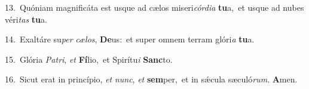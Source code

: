 {\numbfont\textcolor{\numbcolor}{13.}}~Quóniam magnificáta est usque ad cælos miseri\-\textit{cór}\-\textit{di}\textit{a} \textbf{tu}\-a,~\star et usque ad nubes véri\textit{tas} \textbf{tu}\-a.\par
{\numbfont\textcolor{\numbcolor}{14.}}~Exaltáre su\textit{per} \textit{cæ}\-\textit{los}, \textbf{De}\-us:~\star et super omnem terram glóri\textit{a} \textbf{tu}\-a.\par
{\numbfont\textcolor{\numbcolor}{15.}}~Glória \textit{Pa}\-\textit{tri}, \textit{et} \textbf{Fí}\-lio,~\star et Spirítu\textit{i} \textbf{Sanc}\-to.\par
{\numbfont\textcolor{\numbcolor}{16.}}~Sicut erat in princípio, \textit{et} \textit{nunc}\-, \textit{et} \textbf{sem}\-per,~\star et in sǽcula sæculó\-\textit{rum}\-. \textbf{A}\-men.\par
